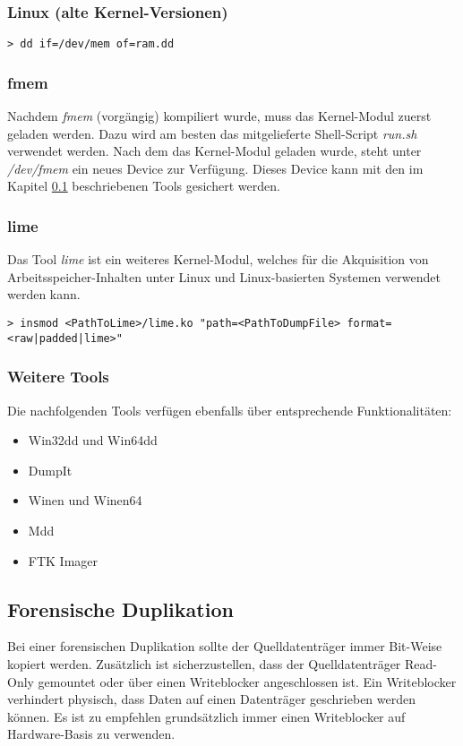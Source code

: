 \subsubsection{Linux (alte Kernel-Versionen)}
\begin{lstlisting}
> dd if=/dev/mem of=ram.dd
\end{lstlisting}

\subsubsection{fmem}
Nachdem \textit{fmem} (vorgängig) kompiliert wurde, muss das Kernel-Modul zuerst geladen werden. Dazu wird am besten das mitgelieferte Shell-Script \textit{run.sh} verwendet werden. Nach dem das Kernel-Modul geladen wurde, steht unter \textit{/dev/fmem} ein neues Device zur Verfügung. Dieses Device kann mit den im Kapitel \ref{subsec:ToolsTechniques:ForensicDuplicate}  beschriebenen Tools gesichert werden.

\subsubsection{lime}
Das Tool \textit{lime} ist ein weiteres Kernel-Modul, welches für die Akquisition von Arbeitsspeicher-Inhalten unter Linux und Linux-basierten Systemen verwendet werden kann.

\begin{lstlisting}
> insmod <PathToLime>/lime.ko "path=<PathToDumpFile> format=<raw|padded|lime>"
\end{lstlisting}

\subsubsection{Weitere Tools}
Die nachfolgenden Tools verfügen ebenfalls über entsprechende Funktionalitäten:
\begin{itemize}
\item Win32dd und Win64dd
\item DumpIt
\item Winen und Winen64
\item Mdd
\item FTK Imager
\end{itemize}

\subsection{Forensische Duplikation} \label{subsec:ToolsTechniques:ForensicDuplicate}
Bei einer forensischen Duplikation sollte der Quelldatenträger immer Bit-Weise kopiert werden. Zusätzlich ist sicherzustellen, dass der Quelldatenträger Read-Only gemountet oder über einen Writeblocker angeschlossen ist. Ein Writeblocker verhindert physisch, dass Daten auf einen Datenträger geschrieben werden können. Es ist zu empfehlen grundsätzlich immer einen Writeblocker auf Hardware-Basis zu verwenden.

